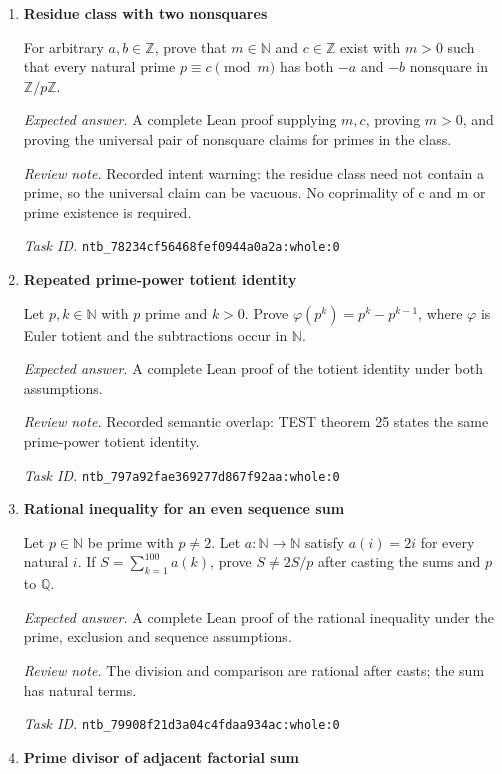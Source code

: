 \documentclass[11pt]{article}
\newcommand{\pth}[1]{\nolinkurl{#1}}
\begin{document}
\begin{enumerate}[label={TEST \arabic*.},leftmargin=4.5em,itemsep=1em]
\item \textbf{Residue class with two nonsquares}\label{qn:test:39}

For arbitrary $a,b\in\mathbb{Z}$, prove that $m\in\mathbb{N}$ and $c\in\mathbb{Z}$ exist with $m>0$ such that every natural prime $p\equiv c\pmod m$ has both $-a$ and $-b$ nonsquare in $\mathbb{Z}/p\mathbb{Z}$.

\emph{Expected answer.} A complete Lean proof supplying $m,c$, proving $m>0$, and proving the universal pair of nonsquare claims for primes in the class.

\emph{Review note.} Recorded intent warning: the residue class need not contain a prime, so the universal claim can be vacuous. No coprimality of c and m or prime existence is required.

\emph{Task ID.} \pth{ntb_78234cf56468fef0944a0a2a:whole:0}

\item \textbf{Repeated prime-power totient identity}\label{qn:test:40}

Let $p,k\in\mathbb{N}$ with $p$ prime and $k>0$. Prove $\varphi(p^k)=p^k-p^{k-1}$, where $\varphi$ is Euler totient and the subtractions occur in $\mathbb{N}$.

\emph{Expected answer.} A complete Lean proof of the totient identity under both assumptions.

\emph{Review note.} Recorded semantic overlap: TEST theorem 25 states the same prime-power totient identity.

\emph{Task ID.} \pth{ntb_797a92fae369277d867f92aa:whole:0}

\item \textbf{Rational inequality for an even sequence sum}\label{qn:test:41}

Let $p\in\mathbb{N}$ be prime with $p\ne2$. Let $a:\mathbb{N}\to\mathbb{N}$ satisfy $a(i)=2i$ for every natural $i$. If $S=\sum_{k=1}^{100}a(k)$, prove $S\ne2S/p$ after casting the sums and $p$ to $\mathbb{Q}$.

\emph{Expected answer.} A complete Lean proof of the rational inequality under the prime, exclusion and sequence assumptions.

\emph{Review note.} The division and comparison are rational after casts; the sum has natural terms.

\emph{Task ID.} \pth{ntb_79908f21d3a04c4fdaa934ac:whole:0}

\item \textbf{Prime divisor of adjacent factorial sum}\label{qn:test:42}


\end{enumerate}
\end{document}
